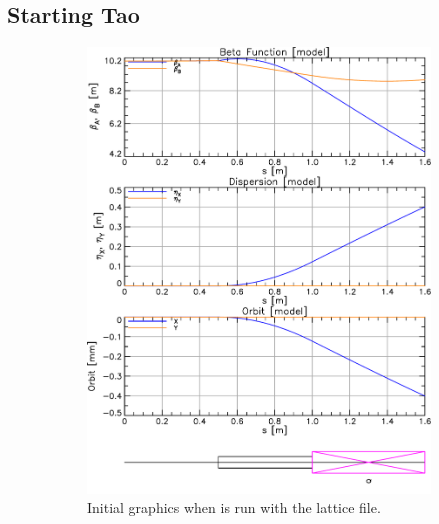 \documentclass{hitec}
\begin{document}
\subsection{Starting Tao}
\label{s:tao.start}

\begin{figure}[tb]
  \centering
  \begin{subfigure}[b]{0.47\textwidth}
    \includegraphics[width=\textwidth]{lat-init.pdf}
    \caption{Initial graphics when \tao is run with the  lattice file.}
    \label{f:lat.init}
  \end{subfigure}
  \hfil
  \begin{subfigure}[b]{0.47\textwidth}

\end{subfigure}
\end{figure}
\end{document}

